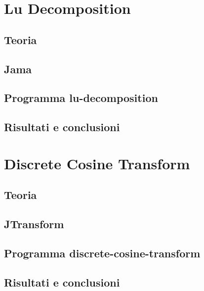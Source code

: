 \documentclass[12pt]{article}
\begin{document}
\maketitle

\section{Lu Decomposition}

\subsection{Teoria}

\subsection{Jama}

\subsection{Programma lu-decomposition}

\subsection{Risultati e conclusioni}

\section{Discrete Cosine Transform}

\subsection{Teoria}

\subsection{JTransform}

\subsection{Programma discrete-cosine-transform}

\subsection{Risultati e conclusioni}
\end{document}
